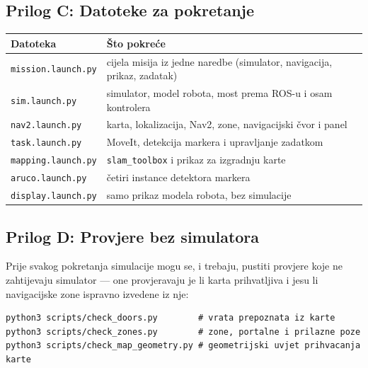 \documentclass[12pt,a4paper]{article}
\begin{document}
\subsection*{Prilog C: Datoteke za pokretanje}

\begin{table}[!htbp]
    \centering
    \scriptsize
    \begin{tabularx}{\textwidth}{@{}l X@{}}
        \toprule
        \textbf{Datoteka} & \textbf{Što pokreće} \\
        \midrule
        \texttt{mission.launch.py}     & cijela misija iz jedne naredbe (simulator, navigacija, prikaz, zadatak) \\
        \texttt{sim.launch.py}         & simulator, model robota, most prema ROS-u i osam kontrolera \\
        \texttt{nav2.launch.py}        & karta, lokalizacija, Nav2, zone, navigacijski čvor i panel \\
        \texttt{task.launch.py}        & MoveIt, detekcija markera i upravljanje zadatkom \\
        \texttt{mapping.launch.py}     & \texttt{slam\_toolbox} i prikaz za izgradnju karte \\
        \texttt{aruco.launch.py}       & četiri instance detektora markera \\
        \texttt{display.launch.py}     & samo prikaz modela robota, bez simulacije \\
        \bottomrule
    \end{tabularx}
\end{table}

\subsection*{Prilog D: Provjere bez simulatora}

Prije svakog pokretanja simulacije mogu se, i trebaju, pustiti provjere koje ne zahtijevaju
simulator --- one provjeravaju je li karta prihvatljiva i jesu li navigacijske zone ispravno
izvedene iz nje:

\begin{lstlisting}[style=log]
python3 scripts/check_doors.py        # vrata prepoznata iz karte
python3 scripts/check_zones.py        # zone, portalne i prilazne poze
python3 scripts/check_map_geometry.py # geometrijski uvjet prihvacanja karte
\end{lstlisting}
\end{document}
